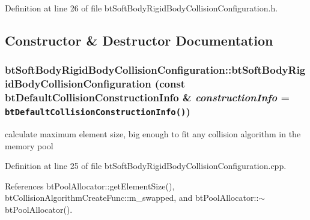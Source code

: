 Definition at line 26 of file btSoftBodyRigidBodyCollisionConfiguration.h.

\subsection{Constructor \& Destructor Documentation}
\hypertarget{classbt_soft_body_rigid_body_collision_configuration_ed032b3ffc351d036e28b503d3cdc801}{
\subsubsection[btSoftBodyRigidBodyCollisionConfiguration]{\setlength{\rightskip}{0pt plus 5cm}btSoftBodyRigidBodyCollisionConfiguration::btSoftBodyRigidBodyCollisionConfiguration (const btDefaultCollisionConstructionInfo \& {\em constructionInfo} = {\tt btDefaultCollisionConstructionInfo()})}}
\label{classbt_soft_body_rigid_body_collision_configuration_ed032b3ffc351d036e28b503d3cdc801}




calculate maximum element size, big enough to fit any collision algorithm in the memory pool 

Definition at line 25 of file btSoftBodyRigidBodyCollisionConfiguration.cpp.

References btPoolAllocator::getElementSize(), btCollisionAlgorithmCreateFunc::m\_\-swapped, and btPoolAllocator::$\sim$btPoolAllocator().

